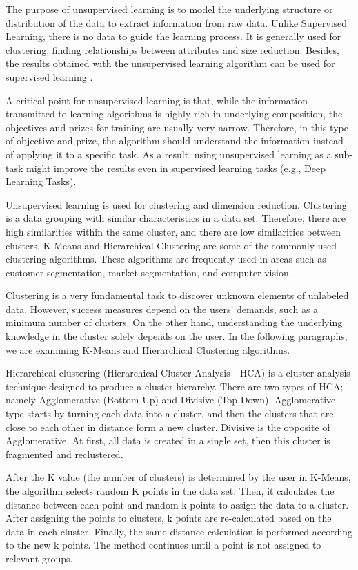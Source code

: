 The purpose of unsupervised learning is to model the underlying structure or distribution of the data to extract information from raw data. Unlike Supervised Learning, there is no data to guide the learning process. It is generally used for clustering, finding relationships between attributes and size reduction. Besides, the results obtained with the unsupervised learning algorithm can be used for supervised learning \cite{chao2011machine}.

A critical point for unsupervised learning is that, while the information transmitted to learning algorithms is highly rich in underlying composition, the objectives and prizes for training are usually very narrow. Therefore, in this type of objective and prize, the algorithm should understand the information instead of applying it to a specific task. As a result, using unsupervised learning as a sub-task might improve the results even in supervised learning tasks (e.g., Deep Learning Tasks).

Unsupervised learning is used for clustering and dimension reduction. Clustering is a data grouping with similar characteristics in a data set. Therefore, there are high similarities within the same cluster, and there are low similarities between clusters. K-Means and Hierarchical Clustering are some of the commonly used clustering algorithms. These algorithms are frequently used in areas such as customer segmentation, market segmentation, and computer vision.

Clustering is a very fundamental task to discover unknown elements of unlabeled data. However, success measures depend on the users' demands, such as a minimum number of clusters. On the other hand, understanding the underlying knowledge in the cluster solely depends on the user. In the following paragraphs, we are examining K-Means and Hierarchical Clustering algorithms.

Hierarchical clustering (Hierarchical Cluster Analysis - HCA) is a cluster analysis technique designed to produce a cluster hierarchy. There are two types of HCA; namely  Agglomerative (Bottom-Up) and Divisive (Top-Down). Agglomerative type starts by turning each data into a cluster, and then the clusters that are close to each other in distance form a new cluster. Divisive is the opposite of Agglomerative. At first, all data is created in a single set, then this cluster is fragmented and reclustered. 

After the K value (the number of clusters) is determined by the user in K-Means, the algorithm selects random K points in the data set. Then, it calculates the distance between each point and random k-points to assign the data to a cluster. After assigning the points to clusters, k points are re-calculated based on the data in each cluster. Finally, the same distance calculation is performed according to the new k points. The method continues until a point is not assigned to relevant groups.

